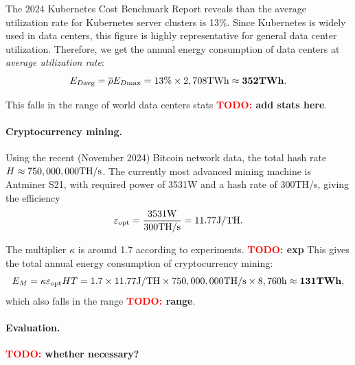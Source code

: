 \documentclass[12pt]{article}
\newcommand{\todo}[1]{\textbf{\textcolor{red}{TODO:} #1}}
\begin{document}
The 2024 Kubernetes Cost Benchmark Report reveals than the average utilization rate for Kubernetes server clusters is 13\%. Since Kubernetes is widely used in data centers, this figure is highly representative for general data center utilization. Therefore, we get the annual energy consumption of data centers at \textit{average utilization rate}:
\begin{equation}
	E_{D \rm avg} = \overline{\rho} E_{D \rm max}
	= \rm 13\% \times 2,708TWh \approx \mathbf{352TWh}.
\end{equation}

This falls in the range of world data centers stats \todo{add stats here}.

\paragraph{Cryptocurrency mining.} Using the recent (November 2024) Bitcoin network data, the total hash rate $H \approx \rm 750,000,000TH/s$. The currently most advanced mining machine is Antminer S21, with required power of 3531W and a hash rate of 300TH/s, giving the efficiency
\begin{equation}
	\varepsilon_{\rm opt} = \rm \frac{3531W}{300TH/s} = 11.77J/TH.
\end{equation}

The multiplier $\kappa$ is around 1.7 according to experiments. \todo{exp} This gives the total annual energy consumption of cryptocurrency mining:
\begin{equation}
	E_M = \kappa \varepsilon_{\rm opt} HT
	= \rm 1.7 \times 11.77J/TH \times 750,000,000TH/s \times 8,760h \approx \mathbf{131TWh},
\end{equation}
which also falls in the range \todo{range}.

\paragraph{Evaluation.} \todo{whether necessary?}



\end{document}
